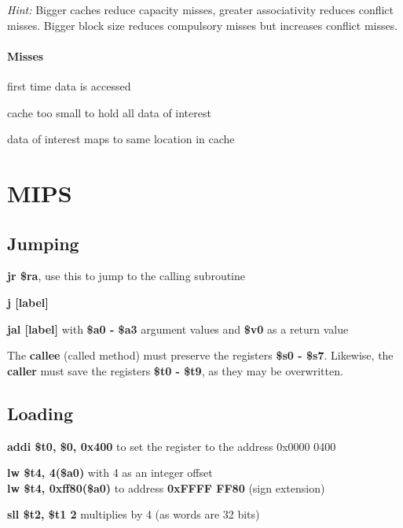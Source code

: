 \documentclass[11pt]{article}
\begin{document}
\emph{Hint:} Bigger caches reduce capacity misses, greater associativity reduces conflict misses.  \newline Bigger block size reduces compulsory misses but increases conflict misses.

\paragraph{Misses}

\begin{description}[labelindent=16pt,style=multiline,leftmargin=4cm, noitemsep]
	\item[Compulsory:] first time data is accessed
	\item[Capacity:] cache too small to hold all data of interest
	\item[Conflict:] data of interest maps to same location in cache
\end{description}

\section{MIPS}

\subsection{Jumping}

\begin{description}[labelindent=16pt,style=multiline,leftmargin=4cm, noitemsep]
	\item[to a register:] \textbf{jr \$ra}, use this to jump to the calling subroutine
	\item[unconditionally:] \textbf{j [label]}
	\item[to a subroutine:] \textbf{jal [label]} with \textbf{\$a0 - \$a3} argument values and \textbf{\$v0} as a return value
\end{description}

The \textbf{callee} (called method) must preserve the registers \textbf{\$s0 - \$s7}. Likewise, the \textbf{caller} must save the registers \textbf{\$t0 - \$t9}, as they may be overwritten.

\subsection{Loading}

\begin{description}[labelindent=16pt,style=multiline,leftmargin=4cm, noitemsep]
	\item[address:] \textbf{addi \$t0, \$0, 0x400} to set the register to the address 0x0000 0400
	\item[load:] \textbf{lw \$t4, 4(\$a0)} with 4 as an integer offset \\
	\textbf{lw \$t4, 0xff80(\$a0)} to address \textbf{0xFFFF FF80} (sign extension)
	\item[byte addressing:] \textbf{sll \$t2, \$t1 2} multiplies by 4 (as words are 32 bits) 
\end{description}
\end{document}
